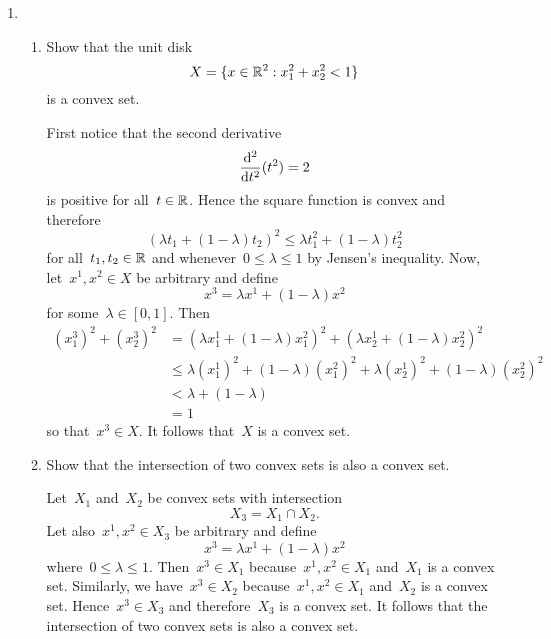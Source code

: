 
\begin{enumerate}

	\item
	\begin{enumerate}

		\item
		Show that the unit disk
		\[ X=\{x\in\mathbb{R}^2:x_1^2+x_2^2<1\} \]
		is a convex set.
		\begin{solution}
			First notice that the second derivative
			\[ \frac{\mathrm{d}^2}{\mathrm{d} t^2}(t^2)=2 \]
			is positive for all~$t\in\mathbb{R}$.
			Hence the square function is convex and therefore
			\[ (\lambda t_1+(1-\lambda)t_2)^2%
				\le\lambda t_1^2+(1-\lambda)t_2^2 \]
			for all~$t_1,t_2\in\mathbb{R}$ and whenever~$0\le\lambda\le1$ by Jensen's inequality.
			Now, let~$x^1,x^2\in X$ be arbitrary and define
			\[ x^3=\lambda x^1+(1-\lambda)x^2 \]
			for some~$\lambda\in[0,1]$.
			Then
			\begin{align}
				(x_1^3)^2+(x_2^3)^2
				&= (\lambda x_1^1+(1-\lambda)x_1^2)^2%
					+(\lambda x_2^1+(1-\lambda)x_2^2)^2\\
				&\le \lambda(x_1^1)^2+(1-\lambda)(x_1^2)^2%
					+\lambda(x_2^1)^2+(1-\lambda)(x_2^2)^2\\
				&< \lambda + (1-\lambda)\\
				&= 1
			\end{align}
			so that~$x^3\in X$.
			It follows that~$X$ is a convex set.
		\end{solution}

		\item
		Show that the intersection of two convex sets is also a convex set.
		\begin{solution}
			Let~$X_1$ and~$X_2$ be convex sets with intersection
			\[ X_3=X_1\cap X_2. \]
			Let also~$x^1,x^2\in X_3$ be arbitrary and define
			\[ x^3=\lambda x^1+(1-\lambda)x^2 \]
			where~$0\le\lambda\le1$.
			Then~$x^3\in X_1$ because~$x^1,x^2\in X_1$ and~$X_1$ is a convex set.
			Similarly, we have~$x^3\in X_2$ because~$x^1,x^2\in X_1$ and~$X_2$ is a convex set.
			Hence~$x^3\in X_3$ and therefore~$X_3$ is a convex set.
			It follows that the intersection of two convex sets is also a convex set.
		\end{solution}

	\end{enumerate}

\end{enumerate}
